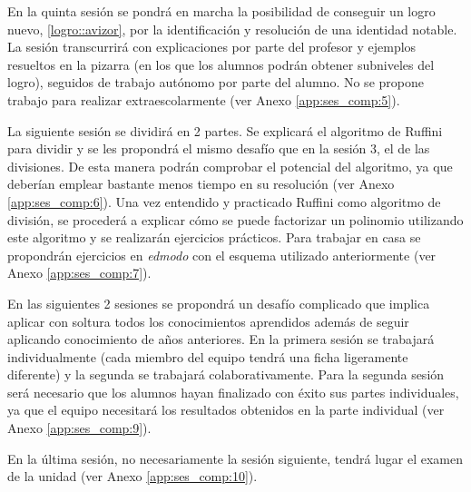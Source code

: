 %
En la quinta sesión se pondrá en marcha la posibilidad de conseguir un logro nuevo, \ref{logro::avizor}, por la identificación y resolución de una identidad notable.
%
La sesión transcurrirá con explicaciones por parte del profesor y ejemplos resueltos en la pizarra (en los que los alumnos podrán obtener subniveles del logro), seguidos de trabajo autónomo por parte del alumno.
%
No se propone trabajo para realizar extraescolarmente (ver Anexo \ref{app:ses_comp:5}).


%
La siguiente sesión se dividirá en 2 partes. 
%
Se explicará el algoritmo de Ruffini para dividir y se les propondrá el mismo desafío que en la sesión 3, el de las divisiones.
%
De esta manera podrán comprobar el potencial del algoritmo, ya que deberían emplear bastante menos tiempo en su resolución (ver Anexo \ref{app:ses_comp:6}).
%
Una vez entendido y practicado Ruffini como algoritmo de división, se procederá a explicar cómo se puede factorizar un polinomio utilizando este algoritmo y se realizarán ejercicios prácticos.
%
Para trabajar en casa se propondrán ejercicios en \textit{edmodo} con el esquema utilizado anteriormente (ver Anexo \ref{app:ses_comp:7}).
%



%

%
En las siguientes 2 sesiones se propondrá un desafío complicado que implica aplicar con soltura todos los conocimientos aprendidos además de seguir aplicando conocimiento de años anteriores.
%
En la primera sesión se trabajará individualmente (cada miembro del equipo tendrá una ficha ligeramente diferente) y la segunda se trabajará colaborativamente.
%
Para la segunda sesión será necesario que los alumnos hayan finalizado con éxito sus partes individuales, ya que el equipo necesitará los resultados obtenidos en la parte individual (ver Anexo \ref{app:ses_comp:9}).


%
En la última sesión, no necesariamente la sesión siguiente, tendrá lugar el examen de la unidad (ver Anexo \ref{app:ses_comp:10}).



